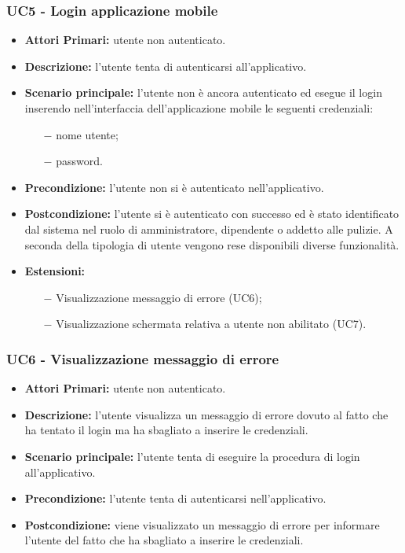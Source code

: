 \subsubsection{ UC5 - Login applicazione mobile}
\begin{itemize}
	\item\textbf{Attori Primari:} utente non autenticato.
	\item\textbf{Descrizione:} l’utente tenta di autenticarsi all'applicativo.
	\item\textbf{Scenario principale:} l’utente non è ancora autenticato ed esegue il login inserendo nell'interfaccia dell'applicazione mobile le seguenti credenziali:
	\begin{itemize}
		\item[$-$] nome utente;
		\item[$-$] password.
	\end{itemize}
	\item\textbf{Precondizione:} l’utente non si è autenticato nell'applicativo. 
	\item\textbf{Postcondizione:} l’utente si è autenticato con successo ed è stato identificato dal sistema
	nel ruolo di amministratore, dipendente o addetto alle pulizie. A seconda della tipologia di utente vengono rese
	disponibili diverse funzionalità.
	\item\textbf{Estensioni:}
	\begin{itemize}
		\item[$-$] Visualizzazione messaggio di errore (UC6);
		\item[$-$] Visualizzazione schermata relativa a utente non abilitato (UC7).
	\end{itemize}
\end{itemize}

\subsubsection{ UC6 - Visualizzazione messaggio di errore}
\begin{itemize}
	\item\textbf{Attori Primari:} utente non autenticato.
	\item\textbf{Descrizione:} l'utente visualizza un messaggio di errore dovuto al fatto che ha tentato il login ma ha sbagliato a inserire le credenziali.
	\item\textbf{Scenario principale:} l’utente tenta di eseguire la procedura di login all'applicativo.
	\item\textbf{Precondizione:} l'utente tenta di autenticarsi nell'applicativo.
	\item\textbf{Postcondizione:} viene visualizzato un messaggio di errore per informare l'utente del fatto che ha sbagliato a inserire le credenziali.
\end{itemize}

